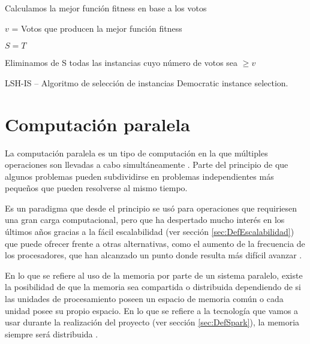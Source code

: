 \begin{algorithm*}
\DontPrintSemicolon
{}

Calculamos la mejor función fitness en base a los votos

$v$ = Votos que producen la mejor función fitness

$S = T$

Eliminamos de S todas las instancias cuyo número de votos sea $\geq v$

\caption{LSH-IS -- Algoritmo de selección de instancias Democratic instance selection. \cite{DemoISPaper}}
\label{alg:DemoIS}
\end{algorithm*}


\section{Computación paralela}\label{sec:CompParalela}

La computación paralela es un tipo de computación en la que múltiples operaciones son llevadas a cabo simultáneamente \cite{Almasi:1989}. Parte del principio de que algunos problemas pueden subdividirse en problemas independientes más pequeños que pueden resolverse al mismo tiempo.

Es un paradigma que desde el principio se usó para operaciones que requiriesen una gran carga computacional, pero que ha despertado mucho interés en los últimos años gracias a la fácil escalabilidad (ver sección \ref{sec:DefEscalabilidad}) que puede ofrecer frente a otras alternativas, como el aumento de la frecuencia de los procesadores, que han alcanzado un punto donde resulta más difícil avanzar \cite{CompParalelaWiki}.

En lo que se refiere al uso de la memoria por parte de un sistema paralelo, existe la posibilidad de que la memoria sea compartida o distribuida dependiendo de si las unidades de procesamiento poseen un espacio de memoria común o cada unidad posee su propio espacio. En lo que se refiere a la tecnología que vamos a usar durante la realización del proyecto (ver sección \ref{sec:DefSpark}), la memoria siempre será distribuida \cite{SparkPaper}.

